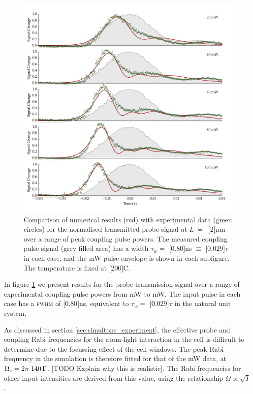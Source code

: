     \begin{figure}[p]
    \includegraphics[width=\linewidth]
      {figs/06_simultons/solve_b_multi_01_fig1.pdf}
    \caption{
    Comparison of numerical results (red) with experimental data (green circles)
    for the normalised transmitted probe signal at $L~=$~\unit[$2$]{$\mu$m} over
    a range of peak coupling pulse powers. The measured coupling pulse signal
    (grey filled area) has a width $\tau_w = $ \unit[$0.80$]{ns} $ \equiv $
    \unit[$0.029$]{$\tau$} in each case, and the \unit[100]{mW} pulse envelope
    is shown in each subfigure. The temperature is fixed at
    \unit[$200$]{\textdegree C}.
    } 
    \label{fig:exp_result_power_dep} 
    \end{figure}
    In figure \ref{fig:exp_result_power_dep} we present results for the probe
    transmission signal over a range of experimental coupling pulse powers from
    \unit[20]{mW} to \unit[100]{mW}. The input pulse in each case has a
    \textsc{fwhm} of \unit[$0.80$]{ns}, equivalent to $\tau_w = $
    \unit[$0.029$]{$\tau$} in the natural unit system.

    As discussed in section \ref{sec:simultons_experiment}, the effective probe
    and coupling Rabi frequencies for the atom-light interaction in the cell is
    difficult to determine due to the focussing effect of the cell windows. The
    peak Rabi frequency in the simulation is therefore fitted for that of the
    \unit[100]{mW} data, at $\Omega_c = \unit[2\pi~140]{\Gamma}$. [TODO Explain
    why this is realistic]. The Rabi frequencies for other input intensities are
    derived from this value, using the relationship $\Omega \propto \sqrt{I}$.

